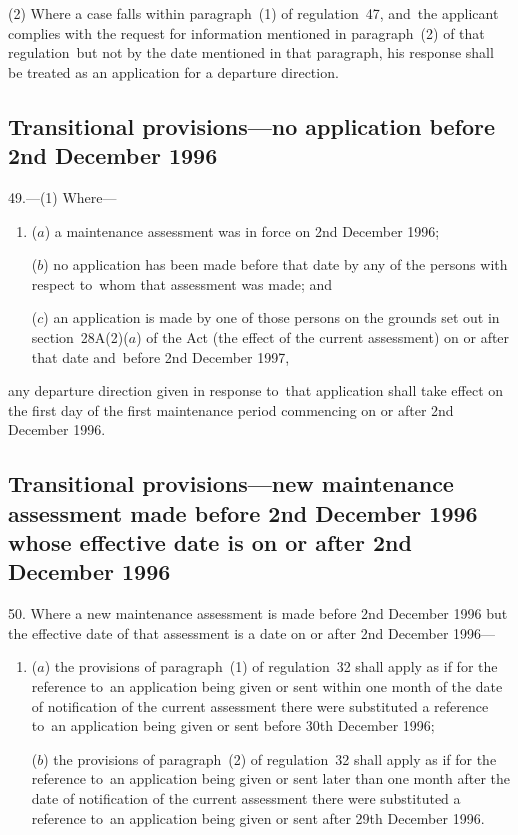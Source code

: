 \documentclass[12pt,a4paper]{article}
\begin{document}
(2) Where a case falls within paragraph~(1) of regulation~47, and~the applicant
complies with the request for information mentioned in paragraph~(2) of that
regulation~but not by the date mentioned in that paragraph, his response shall
be treated as an application for a departure direction.

\subsection[49. Transitional provisions—no application before 2nd December 1996]{Transitional provisions—no application before 2nd December 1996}

49.—(1) Where—
\begin{enumerate}\item[]
($a$) a maintenance assessment was in force on 2nd December 1996;

($b$) no application has been made before that date by any of the persons with
respect to~whom that assessment was made; and

($c$) an application is made by one of those persons on the grounds set out in
section~28A(2)($a$) of the Act (the effect of the current assessment) on or after
that date and~before 2nd December 1997,
\end{enumerate}
any departure direction given in response to~that application shall take effect
on the first day of the first maintenance period commencing on or after 2nd
December 1996.

\subsection[50. Transitional provisions—new maintenance assessment made before 2nd December 1996 whose effective date is on or after 2nd December 1996]{\sloppy Transitional provisions—new maintenance assessment made before 2nd December 1996 whose effective date is on or after 2nd December 1996}

50. Where a new maintenance assessment is made before 2nd December 1996 but the effective date of that assessment is a date on or after 2nd December 1996—
\begin{enumerate}\item[]
($a$) the provisions of paragraph~(1) of regulation~32 shall apply as if for the reference to~an application being given or sent within 
one month  %
of the date of notification of the current assessment there were substituted a reference to~an application being given or sent before 30th December 1996;

($b$) the provisions of paragraph~(2) of regulation~32 shall apply as if for the reference to~an application being given or sent later than 
one month  %
after the date of notification of the current assessment there were substituted a reference to~an application being given or sent after 29th December 1996.
\end{enumerate}
\end{document}
